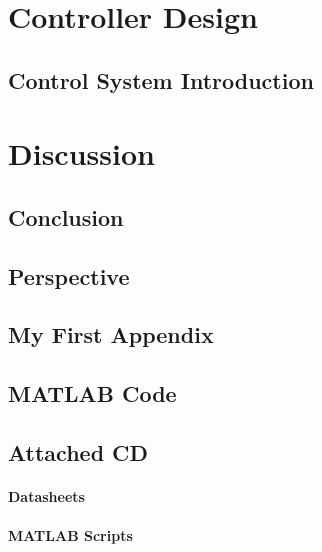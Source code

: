 \part{Controller Design}\label{part:part2}
\chapter{Control System Introduction}\label{chap:systemdesign}

\part{Discussion}\label{part:part3}
\chapter{Conclusion}\label{chap:conclusion}


\chapter{Perspective}\label{chap:perspektivering}


\begingroup
\raggedright
\clearpage
{}

\endgroup
\label{sourceliste}

\newpage

\begin{appendices}
\appendix
\renewcommand{\appendixname}{Appendix}
\renewcommand{\appendixtocname}{Appendix}

\chapter{My First Appendix}\label{app:vest}

\chapter{MATLAB Code}\label{app:source}

\chapter{Attached CD} \label{chap:cd}
\subsection*{Datasheets}
\subsection*{MATLAB Scripts}

\end{appendices}
